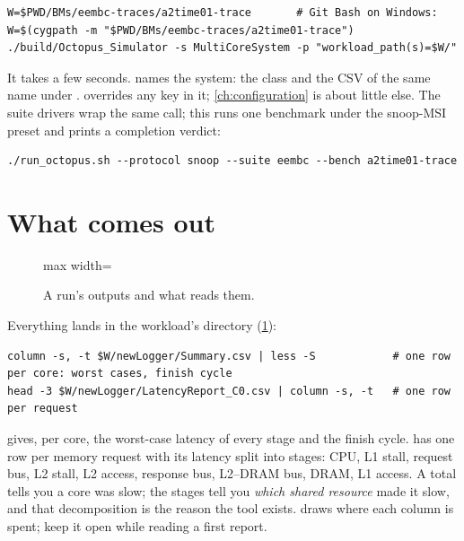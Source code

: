 \begin{lstlisting}[style=shell]
W=$PWD/BMs/eembc-traces/a2time01-trace       # Git Bash on Windows: W=$(cygpath -m "$PWD/BMs/eembc-traces/a2time01-trace")
./build/Octopus_Simulator -s MultiCoreSystem -p "workload_path(s)=$W/"
\end{lstlisting}

It takes a few seconds.  names the system: the class  and the
CSV of the same name under .  overrides any
key in it; \cref{ch:configuration} is about little else. The suite drivers wrap the same call; this runs
one benchmark under the snoop-MSI preset and prints a completion verdict:

\begin{lstlisting}[style=shell]
./run_octopus.sh --protocol snoop --suite eembc --bench a2time01-trace
\end{lstlisting}

\section{What comes out}

\begin{figure}[htbp]\centering
\begin{adjustbox}{max width=\textwidth}\end{adjustbox}
\caption{A run's outputs and what reads them.}
\label{fig:what-comes-out}
\end{figure}

Everything lands in the workload's  directory (\cref{fig:what-comes-out}):

\begin{lstlisting}[style=shell]
column -s, -t $W/newLogger/Summary.csv | less -S            # one row per core: worst cases, finish cycle
head -3 $W/newLogger/LatencyReport_C0.csv | column -s, -t   # one row per request
\end{lstlisting}

 gives, per core, the worst-case latency of every stage and the finish cycle.
 has one row per memory request with its latency split into
stages: CPU, L1 stall, request bus, L2 stall, L2 access, response bus, L2--DRAM bus, DRAM, L1
access. A total tells you a core was slow; the stages tell you \emph{which shared resource}
made it slow, and that decomposition is the reason the tool exists. 
draws where each column is spent; keep it open while reading a first report.

